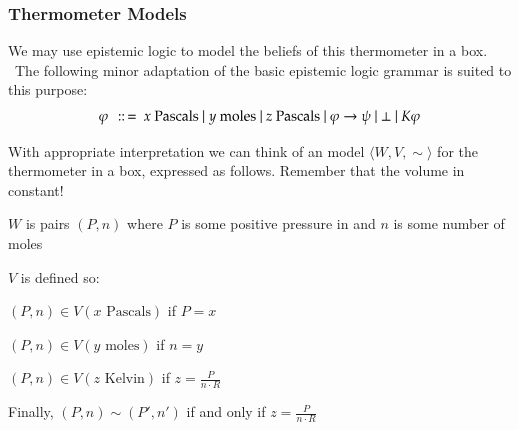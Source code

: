 \begin{frame}[allowframebreaks]
\frametitle{Thermometer Models}
\begin{itemizedot}
  \item We may use epistemic logic to model the beliefs of this thermometer in
  a box. \ The following minor adaptation of the basic epistemic logic grammar
  is suited to this purpose:
  \[ \varphi \text{ } \,::\, = \text{ } x \text{ Pascals} \text{
     } | \text{ } y \text{ moles} \text{ } | \text{ } z \text{ Pascals} \text{
     } | \text{ } \varphi \rightarrow \psi \text{ } | \text{ } \bot \text{ } |
     \text{ } K \varphi \]
\end{itemizedot}
\framebreak
\begin{itemizedot}
  \item With appropriate interpretation we can think of an  model
  $\langle W, V, \sim \rangle$ for the thermometer in a box, expressed as
  follows. Remember that the volume in constant!
  \begin{itemizedot}
    \item $W$ is pairs $(P, n)$ where $P$ is some positive pressure in
     and $n$ is some number of moles
    
    \item $V$ is defined so:
    \begin{itemizedot}
      \item $(P, n) \in V (x \text{ Pascals})$ if $P = x$
      
      \item $(P, n) \in V (y \text{ moles})$ if $n = y$
      
      \item $(P, n) \in V (z \text{ Kelvin})$ if $z = \frac{P}{n \cdot R}$
    \end{itemizedot}
    \item Finally, $(P, n) \sim (P', n')$ if and only if $z = \frac{P}{n \cdot
    R}$
  \end{itemizedot}
\end{itemizedot}
\end{frame}
